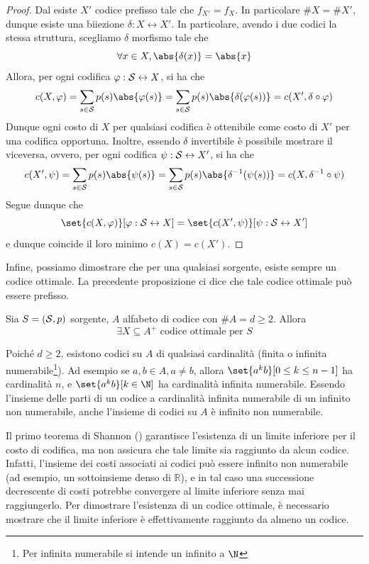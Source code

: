 \begin{proof}
  Dal  esiste \(X'\) codice prefisso tale che \(f_{X'} = f_X\).
  In particolare \(\# X = \# X'\), dunque esiste una biiezione \(\delta: X \leftrightarrow X'\).
  In particolare, avendo i due codici la stessa struttura, scegliamo \(\delta\) morfismo tale che
  \[\forall x \in X, \abs{\delta(x)} = \abs{x}\]
  Allora, per ogni codifica \(\varphi : \mathcal{S} \leftrightarrow X\), si ha che
  \[c(X,\varphi) = \sum_{s \in \SCal} p(s)\abs{\varphi(s)} = \sum_{s \in \SCal} p(s)\abs{\delta(\varphi(s))} = c(X', \delta \circ \varphi)\]
  Dunque ogni costo di \(X\) per qualsiasi codifica è ottenibile come costo di \(X'\) per una codifica opportuna.
  Inoltre, essendo \(\delta\) invertibile è possibile mostrare il viceversa, ovvero, per ogni codifica \(\psi: \mathcal{S} \leftrightarrow X'\), si ha che
  \[c(X',\psi) = \sum_{s \in \SCal} p(s)\abs{\psi(s)} = \sum_{s \in \SCal} p(s)\abs{\delta^{-1}(\psi(s))} = c(X, \delta^{-1} \circ \psi)\]
  Segue dunque che
  \[\set{c(X,\varphi)}[\varphi:\SCal \leftrightarrow X] = \set{c(X',\psi)}[\psi:\SCal \leftrightarrow X']\]
  e dunque coincide il loro minimo \(c(X) = c(X')\).
\end{proof}

Infine, possiamo dimostrare che per una qualsiasi sorgente, esiste sempre un codice ottimale. La precedente proposizione ci dice che tale codice ottimale può essere prefisso.

\begin{proposition}[label=prop:optimal_prefix_code]{}
  Sia \(S = (\mathcal{S}, p)\) sorgente, \(A\) alfabeto di codice con \(\# A = d \geq 2\). Allora
  \[\exists X \subseteq A^+ \text{ codice ottimale per } S\]
\end{proposition}

Poiché \(d \geq 2\), esistono codici su \(A\) di qualsiasi cardinalità (finita o infinita numerabile\footnote{Per infinita numerabile si intende un infinito  a \(\N\)}).
Ad esempio se \(a,b \in A, a \neq b\), allora \(\set{a^k b}[0 \leq k \leq n-1]\) ha cardinalità \(n\), e \(\set{a^k b}[k \in \N]\) ha cardinalità infinita numerabile. 
Essendo l'insieme delle parti di un codice a cardinalità infinita numerabile di un infinito non numerabile, anche l'insieme di codici su $A$ è infinito non numerabile.

Il primo teorema di Shannon () garantisce l’esistenza di un limite inferiore per il costo di codifica, ma non assicura che tale limite sia raggiunto da alcun codice. Infatti, l’insieme dei costi associati ai codici può essere infinito non numerabile (ad esempio, un sottoinsieme denso di $\mathbb{R}$), e in tal caso una successione decrescente di costi potrebbe convergere al limite inferiore senza mai raggiungerlo. Per dimostrare l’esistenza di un codice ottimale, è necessario mostrare che il limite inferiore è effettivamente raggiunto da almeno un codice.

